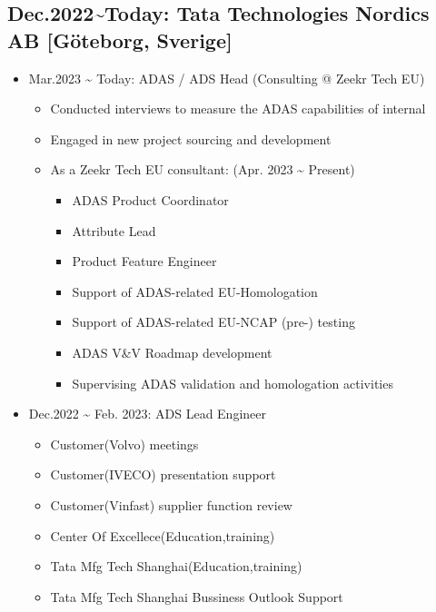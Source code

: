 \documentclass[12pt,a4paper]{article}
\begin{document}
\subsection{Dec.2022{\textasciitilde}Today: Tata Technologies Nordics AB [Göteborg, Sverige]}
\begin{itemize}
\item Mar.2023 {\textasciitilde} Today: ADAS / ADS Head (Consulting @ Zeekr Tech EU)

\begin{itemize}
\item Conducted interviews to measure the ADAS capabilities of internal


\item Engaged in new project sourcing and development 


\item As a Zeekr Tech EU consultant: (Apr. 2023 {\textasciitilde} Present)

\begin{itemize}
\item ADAS Product Coordinator 


\item Attribute Lead 


\item Product Feature Engineer 


\item Support of ADAS-related EU-Homologation


\item Support of ADAS-related EU-NCAP (pre-) testing


\item ADAS V\&V Roadmap development


\item Supervising ADAS validation and homologation activities

\end{itemize}
\end{itemize}

\item Dec.2022 {\textasciitilde} Feb. 2023: ADS Lead Engineer 

\begin{itemize}
\item Customer(Volvo) meetings


\item Customer(IVECO) presentation support


\item Customer(Vinfast) supplier function review


\item Center Of Excellece(Education,training)


\item Tata Mfg Tech Shanghai(Education,training)


\item Tata Mfg Tech Shanghai Bussiness Outlook Support

\end{itemize}
\end{itemize}
\end{document}
